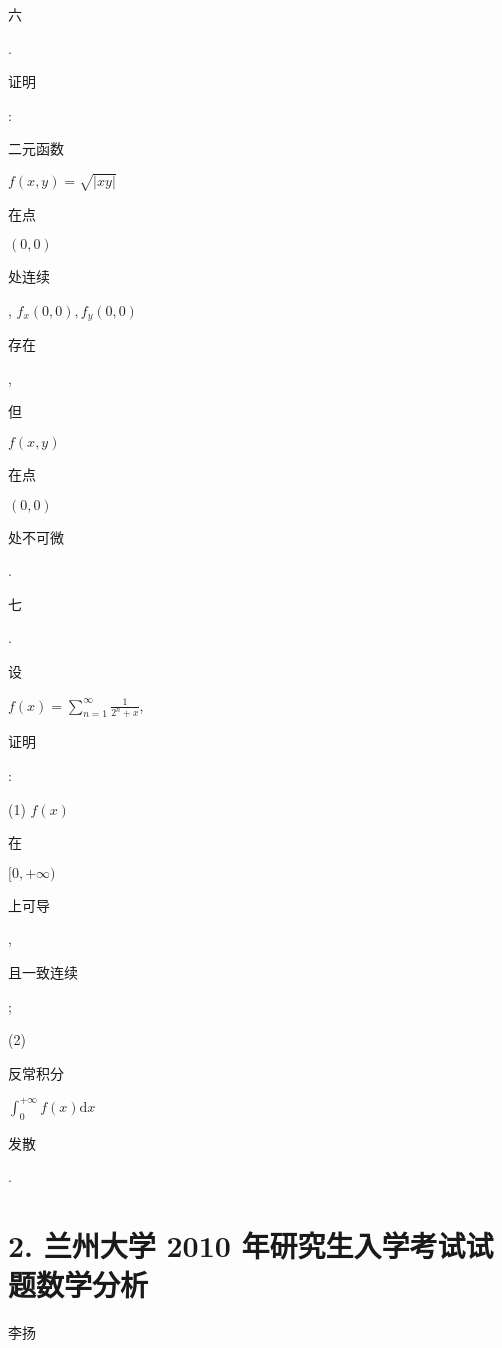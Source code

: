 \documentclass[10pt]{article}
\begin{document}
\begin{CJK}{UTF8}{mj}六\end{CJK}. \begin{CJK}{UTF8}{mj}证明\end{CJK}: \begin{CJK}{UTF8}{mj}二元函数\end{CJK} $f(x, y)=\sqrt{|x y|}$ \begin{CJK}{UTF8}{mj}在点\end{CJK} $(0,0)$ \begin{CJK}{UTF8}{mj}处连续\end{CJK}, $f_{x}(0,0), f_{y}(0,0)$ \begin{CJK}{UTF8}{mj}存在\end{CJK}, \begin{CJK}{UTF8}{mj}但\end{CJK} $f(x, y)$ \begin{CJK}{UTF8}{mj}在点\end{CJK} $(0,0)$ \begin{CJK}{UTF8}{mj}处不可微\end{CJK}.

\begin{CJK}{UTF8}{mj}七\end{CJK}. \begin{CJK}{UTF8}{mj}设\end{CJK} $f(x)=\sum_{n=1}^{\infty} \frac{1}{2^{n}+x}$, \begin{CJK}{UTF8}{mj}证明\end{CJK}:

(1) $f(x)$ \begin{CJK}{UTF8}{mj}在\end{CJK} $[0,+\infty)$ \begin{CJK}{UTF8}{mj}上可导\end{CJK}, \begin{CJK}{UTF8}{mj}且一致连续\end{CJK};

(2) \begin{CJK}{UTF8}{mj}反常积分\end{CJK} $\int_{0}^{+\infty} f(x) \mathrm{d} x$ \begin{CJK}{UTF8}{mj}发散\end{CJK}.

\section{2. 兰州大学 2010 年研究生入学考试试题数学分析}
\begin{CJK}{UTF8}{mj}李扬\end{CJK}
\end{document}
